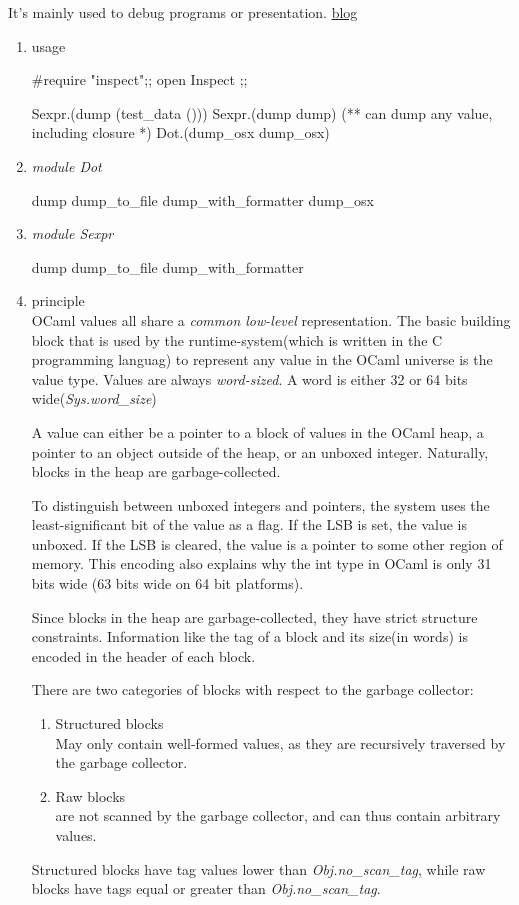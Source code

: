 

It's mainly used to debug programs or presentation.
\href{http://lambdamuesli.blogspot.com/}{blog}
\begin{enumerate}
\item usage
  \begin{bluetext}
#require "inspect";;
open Inspect ;;

Sexpr.(dump (test_data ()))
Sexpr.(dump dump) (** can dump any value, including closure *)
Dot.(dump_osx dump_osx)
\end{bluetext}



\item \textit{module Dot}
  \begin{bluetext}
    dump
    dump_to_file
    dump_with_formatter
    dump_osx
  \end{bluetext}
\item \textit{module Sexpr}
  \begin{bluetext}
    dump
    dump_to_file
    dump_with_formatter
  \end{bluetext}

\item principle \\
  OCaml values all share a \textit{common low-level} representation.
  The basic building block that is used by the runtime-system(which is
  written in the C programming languag) to represent any value in the
  OCaml universe is the value type. Values are always
  \textit{word-sized}. A word is either 32 or 64 bits
  wide(\textit{Sys.word\_size})

  A value can either be a pointer to a block of values in the OCaml
  heap, a pointer to an object outside of the heap, or an unboxed
  integer. Naturally, blocks in the heap are garbage-collected.

  To distinguish between unboxed integers and pointers, the system uses
  the least-significant bit of the value as a flag. If the LSB is set,
  the value is unboxed. If the LSB is cleared, the value is a pointer to
  some other region of memory. This encoding also explains why the int
  type in OCaml is only 31 bits wide (63 bits wide on 64 bit platforms).


  Since blocks in the heap are garbage-collected, they have strict
  structure constraints. Information like the tag of a block and its
  size(in words) is encoded in the header of each block.

  There are two categories of blocks with respect to the garbage collector:
  \begin{enumerate}
  \item Structured blocks \\
  May only contain well-formed values, as they are
  recursively traversed by the garbage collector.
  \item Raw blocks    \\
  are not scanned by the garbage collector, and can thus
  contain arbitrary values.
  \end{enumerate}
  Structured blocks have tag values lower than
  \textit{Obj.no\_scan\_tag}, while raw blocks have tags equal or
  greater than \textit{Obj.no\_scan\_tag}.
  


\end{enumerate}

